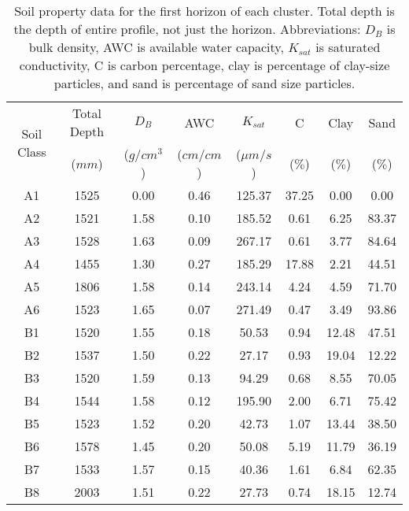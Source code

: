\begin{table}[h!]
	\caption[Soil property data for the first horizon of each cluster]{Soil property data for the first horizon of each cluster. Total depth is the depth of entire profile, not just the horizon. Abbreviations: $D_B$ is bulk density, AWC is available water capacity, $K_{sat}$ is saturated conductivity, C is carbon percentage, clay is percentage of clay-size particles, and sand is percentage of sand size particles.}
	\centering
		\begin{tabular}{c c c c c c c c}
			\hline
			\multirow{2}{*}{Soil Class}	 & 	Total Depth	 & 	$D_B$	 & 	AWC	 & 	$K_{sat}$	 & 	C	 & 	Clay	 & 	Sand \\
										& 	($mm$)	 	& ($g/cm^3$)& ($cm/cm$)& 	($\mu m/s$)	 & 	($\%$)	 & 	($\%$)	 & 	($\%$) \\[0.5ex]
			\hline \hline
			A1	 & 	1525	 & 	0.00	 & 	0.46	 & 	125.37	 & 	37.25	 & 	0.00	 & 	0.00  \\
			A2	 & 	1521	 & 	1.58	 & 	0.10	 & 	185.52	 & 	0.61	 & 	6.25	 & 	83.37 \\
			A3	 & 	1528	 & 	1.63	 & 	0.09	 & 	267.17	 & 	0.61	 & 	3.77	 & 	84.64 \\
			A4	 & 	1455	 & 	1.30	 & 	0.27	 & 	185.29	 & 	17.88	 & 	2.21	 & 	44.51 \\
			A5	 & 	1806	 & 	1.58	 & 	0.14	 & 	243.14	 & 	4.24	 & 	4.59	 & 	71.70 \\
			A6	 & 	1523	 & 	1.65	 & 	0.07	 & 	271.49	 & 	0.47	 & 	3.49	 & 	93.86 \\
			B1	 & 	1520	 & 	1.55	 & 	0.18	 & 	50.53	 & 	0.94	 & 	12.48	 & 	47.51 \\
			B2	 & 	1537	 & 	1.50	 & 	0.22	 & 	27.17	 & 	0.93	 & 	19.04	 & 	12.22 \\
			B3	 & 	1520	 & 	1.59	 & 	0.13	 & 	94.29	 & 	0.68	 & 	8.55	 & 	70.05 \\
			B4	 & 	1544	 & 	1.58	 & 	0.12	 & 	195.90	 & 	2.00	 & 	6.71	 & 	75.42 \\
			B5	 & 	1523	 & 	1.52	 & 	0.20	 & 	42.73	 & 	1.07	 & 	13.44	 & 	38.50 \\
			B6	 & 	1578	 & 	1.45	 & 	0.20	 & 	50.08	 & 	5.19	 & 	11.79	 & 	36.19 \\
			B7	 & 	1533	 & 	1.57	 & 	0.15	 & 	40.36	 & 	1.61	 & 	6.84	 & 	62.35 \\
			B8	 & 	2003	 & 	1.51	 & 	0.22	 & 	27.73	 & 	0.74	 & 	18.15	 & 	12.74 \\

\end{tabular}
\end{table}

